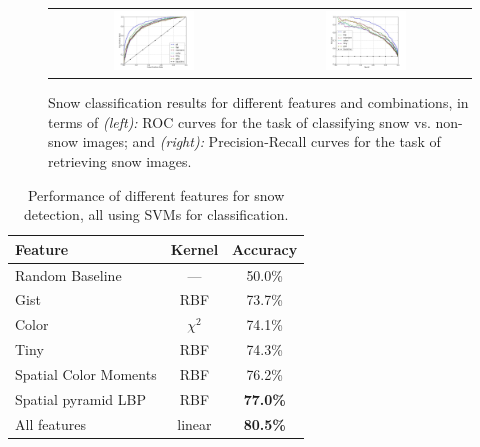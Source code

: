 \begin{figure}[th!]
\begin{center}
\vspace{-16pt}
\begin{tabular}{cc}
 \includegraphics[width=0.4\textwidth]{figs/ROC-curves.jpg} &
\includegraphics[width=0.4\textwidth]{figs/PR-curves.jpg} \\
\end{tabular}
\end{center}
\vspace{-8pt}
\caption{
Snow classification results for different features and combinations, in terms of {\textit{(left):}} ROC curves for the task of classifying snow vs. non-snow images; and 
{\textit{(right):}} Precision-Recall curves for the task of retrieving snow images.
}
\label{fig:PR_ROC_snow}
\end{figure}

\begin{table}[b]
\begin{center}
{\footnotesize{
\begin{tabular}{|l|c|c|}
\hline 
Feature & Kernel  & Accuracy\tabularnewline
\hline 
\hline 
Random Baseline  & --- & 50.0\%\tabularnewline
\hline 
\hline
Gist & RBF & 73.7\%\tabularnewline
\hline 
Color  & $\chi^2$ & 74.1\%\tabularnewline
\hline
Tiny & RBF & 74.3\%\tabularnewline
\hline 
Spatial Color Moments & RBF & 76.2\%\tabularnewline
\hline 
Spatial pyramid LBP & RBF &\textbf{77.0\%}\tabularnewline
\hline 
\hline
All features  & linear & \textbf{80.5\%}\tabularnewline
\hline 
\end{tabular}
}}
\caption{Performance of different features  for snow detection, all using SVMs for classification. }
\label{tab:snow}
\end{center}
\end{table}



